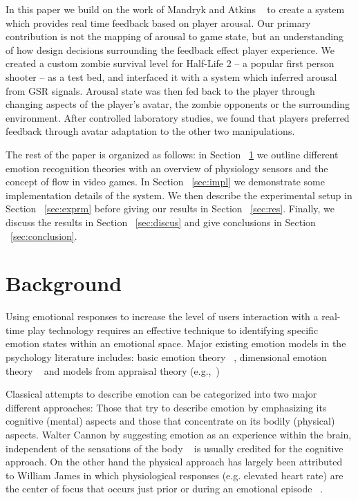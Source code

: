 \documentclass[conference]{IEEEtran}
\begin{document}
In this paper we build on the work of Mandryk and Atkins ~\cite{mandryk2007fuzzy} to create a system which provides real time feedback based on player arousal. Our primary contribution is not the mapping of arousal to game state, but an understanding of how design decisions surrounding the feedback effect player experience. We created a custom zombie survival level for Half-Life 2 – a popular first person shooter – as a test bed, and interfaced it with a system which inferred arousal from GSR signals. Arousal state was then fed back to the player through changing aspects of the player’s avatar, the zombie opponents or the surrounding environment. After controlled laboratory studies, we found that players preferred feedback through avatar adaptation to the other two manipulations.

The rest of the paper is organized as follows: in Section ~\ref{sec:lit-review} we outline different emotion recognition theories with an overview of physiology sensors and the concept of flow in video games. In Section ~\ref{sec:impl} we demonstrate some implementation details of the system. We then describe the experimental setup in Section ~\ref{sec:exprm} before giving our results in Section ~\ref{sec:res}. Finally, we discuss the results in Section ~\ref{sec:discus} and give conclusions in Section ~\ref{sec:conclusion}.


\section{Background}
\label{sec:lit-review}

Using emotional responses to increase the level of users interaction with a real-time play technology requires an effective technique to identifying specific emotion states within an emotional space. Major existing emotion models in the psychology literature includes: basic emotion theory ~\cite{ekman1992argument, ekman1992there}, dimensional emotion theory ~\cite{lang1995emotion, russell1980circumplex} and models from appraisal theory (e.g.,~\cite{roseman2001model}) ~\cite{zhang2010service}

Classical attempts to describe emotion can be categorized into two major different approaches: Those that try to describe emotion by emphasizing its cognitive (mental) aspects and those that concentrate on its bodily (physical) aspects. Walter Cannon by suggesting emotion as an experience within the brain, independent of the sensations of the body ~\cite{cannon1927james} is usually credited for the cognitive approach. On the other hand the physical approach has largely been attributed to William James in which physiological responses (e.g. elevated heart rate) are the center of focus that occurs just prior or during an emotional episode ~\cite{paiva2007affective}.
\end{document}
